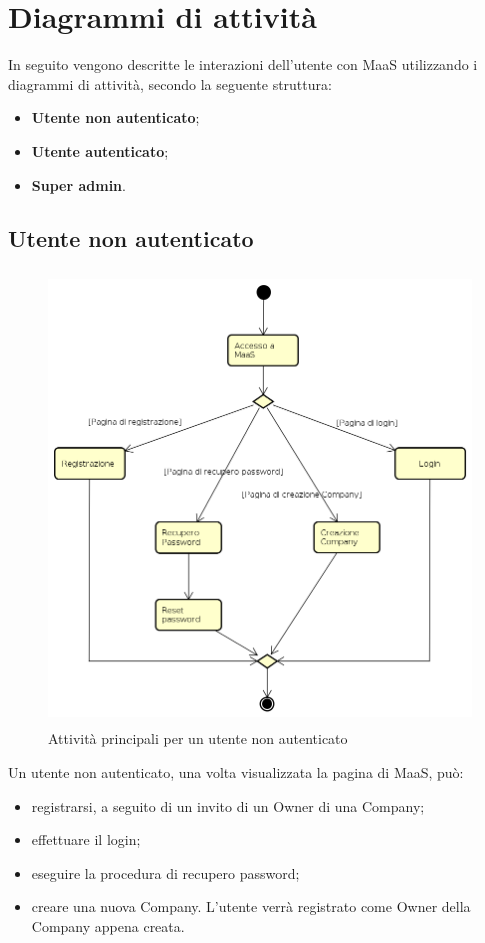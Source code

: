 \section{Diagrammi di attività}
In seguito vengono descritte le interazioni dell'utente con MaaS utilizzando i diagrammi di attività, secondo la seguente struttura:
\begin{itemize}
\item \textbf{Utente non autenticato};
\item \textbf{Utente autenticato};
\item \textbf{Super admin}.
\end{itemize}
\subsection{Utente non autenticato}
\begin{figure}[H]
\begin{center}
\includegraphics[height=12cm]{res/sections/backend/activities/principaliSenzaAuth.png}
\caption{Attività principali per un utente non autenticato}
\end{center}
\end{figure}
Un utente non autenticato, una volta visualizzata la pagina di MaaS, può:
\begin{itemize}
\item registrarsi, a seguito di un invito di un Owner di una Company;
\item effettuare il login;
\item eseguire la procedura di recupero password;
\item creare una nuova Company. L'utente verrà registrato come Owner della Company appena creata.
\end{itemize}
